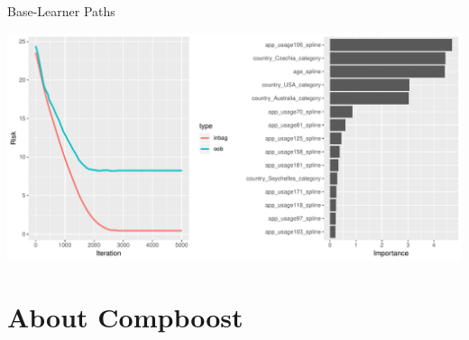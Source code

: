 \documentclass[10pt]{beamer}\usepackage[]{graphicx}\usepackage[]{color}
\newenvironment{knitrout}{}{} %
\begin{document}
\begin{frame}{Base-Learner Paths}



\begin{knitrout}
\color{fgcolor}

{\centering \includegraphics[width=\textwidth]{figure/unnamed-chunk-5-1} 

}



\end{knitrout}

\end{frame}


\section{About Compboost}
\end{document}
